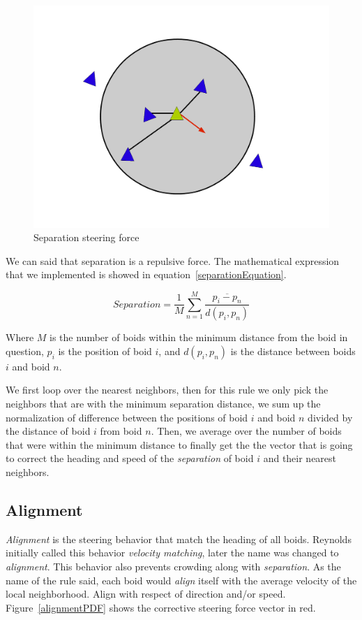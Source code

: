 \begin{figure}[htbp]
\begin{center}
\includegraphics[scale=0.3]{figures/separation.pdf}
\caption{Separation steering force}
\label{separationPDF}
\end{center}
\end{figure}

We can said that separation is a repulsive force. The mathematical expression that we implemented is showed in equation~\ref{separationEquation}.

\begin{equation}
\label{separationEquation}
Separation =\frac{1}{M} \sum_{n=1}^{M} \frac{\overline{p_i - p_n}}{d(p_i,p_n)}
\end{equation}

Where $M$ is the number of boids within the minimum distance from the boid in question, $p_i$ is the position of boid $i$, and $d(p_i,p_n)$ is the distance between boids $i$ and boid $n$.

We first loop over the nearest neighbors, then for this rule we only pick the neighbors that are with the minimum separation distance, we sum up the normalization of difference between the positions of boid $i$ and boid $n$ divided by the distance of boid $i$ from boid $n$. Then, we average over the number of boids that were within the minimum distance to finally get the the vector that is going to correct the heading and speed of the \textit{separation} of boid $i$  and their nearest neighbors. 

\subsection{Alignment}
\textit{Alignment} is the steering behavior that match the heading of all boids. Reynolds initially called this behavior \textit{velocity matching}, later the name was changed to \textit{alignment}. This behavior also prevents crowding along with \textit{separation}. As the name of the rule said, each boid would \textit{align} itself with the average velocity of the local neighborhood. Align with respect of direction and/or speed. Figure~\ref{alignmentPDF}  shows the corrective steering force vector in red.

